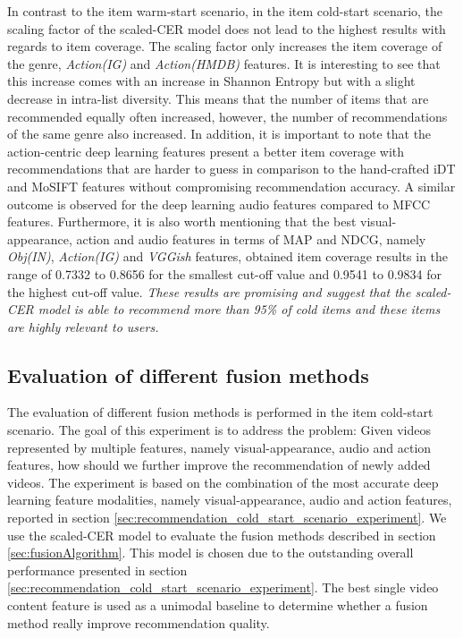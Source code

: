 \documentclass[review]{elsarticle}
\begin{document}
In contrast to the item warm-start scenario, in the item cold-start scenario, the scaling factor of the scaled-CER model does not lead to the highest results with regards to item coverage. The scaling factor only increases the item coverage of the genre, \textit{Action(IG)} and \textit{Action(HMDB)} features. It is interesting to see that this increase comes with an increase in Shannon Entropy but with a slight decrease in intra-list diversity. This means that the number of items that are recommended equally often increased, however, the number of recommendations of the same genre also increased. In addition, it is important to note that the action-centric deep learning features present a better item coverage with recommendations that are harder to guess in comparison to the hand-crafted iDT and MoSIFT features without compromising recommendation accuracy. A similar outcome is observed for the deep learning audio features compared to MFCC features. Furthermore, it is also worth mentioning that the best visual-appearance, action and audio features in terms of MAP and NDCG, namely \textit{Obj(IN)}, \textit{Action(IG)} and \textit{VGGish} features, obtained item coverage results in the range of 0.7332 to 0.8656 for the smallest cut-off value and 0.9541 to 0.9834 for the highest cut-off value. \textit{These results are promising and suggest that the scaled-CER model is able to recommend more than 95\% of cold items and these items are highly relevant to users.} 

\subsection{Evaluation of different fusion methods}
The evaluation of different fusion methods is performed in the item cold-start scenario. The goal of this experiment is to address the problem: Given videos represented by multiple features, namely visual-appearance, audio and action features, how should we further improve the recommendation of newly added videos. The experiment is based on the combination of the most accurate deep learning feature modalities, namely visual-appearance, audio and action features, reported in section \ref{sec:recommendation_cold_start_scenario_experiment}. We use the scaled-CER model to evaluate the fusion methods described in section \ref{sec:fusionAlgorithm}. This model is chosen due to the outstanding overall performance presented in section \ref{sec:recommendation_cold_start_scenario_experiment}. The best single video content feature is used as a unimodal baseline to determine whether a fusion method really improve recommendation quality.
\end{document}
